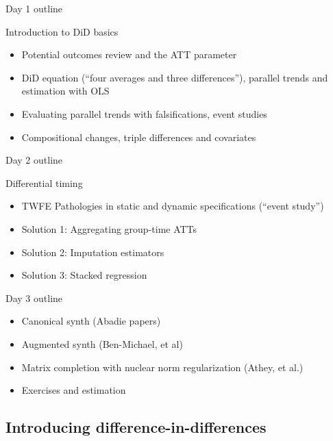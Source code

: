 \documentclass{beamer}
\begin{document}
\begin{frame}{Day 1 outline}

Introduction to DiD basics 
	\begin{itemize}
	\item Potential outcomes review and the ATT parameter
	\item DiD equation (``four averages and three differences''), parallel trends and estimation with OLS
	\item Evaluating parallel trends with falsifications, event studies 
	\item Compositional changes, triple differences and covariates
	\end{itemize}

\end{frame}


\begin{frame}{Day 2 outline}

 Differential timing
	\begin{itemize}
	\item TWFE Pathologies in static and dynamic specifications (``event study'')
	\item Solution 1: Aggregating group-time ATTs
	\item Solution 2: Imputation estimators
	\item Solution 3: Stacked regression
	\end{itemize}

\end{frame}

\begin{frame}{Day 3 outline}

\begin{itemize}
\item Canonical synth (Abadie papers)
\item Augmented synth (Ben-Michael, et al)
\item Matrix completion with nuclear norm regularization (Athey, et al.)
\item Exercises and estimation 
\end{itemize}

\end{frame}

\subsection{Introducing difference-in-differences}
\end{document}
